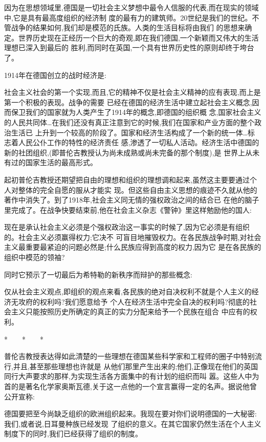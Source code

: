 ﻿\documentclass[12pt]{article}
\begin{document}
因为在思想领域里,德国是一切社会主义梦想中最令人信服的代表,而在现实的领域中,它是具有最高度组织的经济制
度的最有力的建筑师。20世纪是我们的世纪。不管战争的结果如何,我们却是模范的氏族。人类的生活目标将由我们
的思想来确定。世界历史现在正经历一个巨大的奇观,即在我们德国,一个新颖而又伟大的生活理想已深入到最后的
胜利,而同时在英国,一个具有世界历史性的原则却终于垮台了。

1914年在德国创立的战时经济是:

社会主义社会的第一个实现,而且,它的精神不仅是社会主义精神的应有表现,而上是第一个积极的表现。战争的需要
已经在德国的经济生活中建立起社会主义概念,因而保卫我们的国家就为人类产生了1914年的概念,即德国的组织概
念,国家社会主义的人民共同体\ldots 在我们还没有真正注意到它的时候,我们在国家和产业方面的整个政治生活已
上升到一个较高的阶段了。国家和经济生活构成了一个新的统一体\ldots 标志着人民公仆工作的特性的经济责任
感,渗透了一切私人活动。经济生活中德国的新的社团组织,(即普伦吉教授认为尚未成熟或尚未完备的那个制度),是
世界上从未有过的国家生活的最高形式。

起初普伦吉教授还期望把自由的理想和组织的理想调和起来,虽然这主要要通过个人对整体的完全自愿的服从才能实
现。但这些自由主义思想的痕迹不久就从他的著作中消失了。到了1918年,社会主义同无情的强权政治之间的结合已
在他的脑子里完成了。在战争快要结束前,他在社会主义杂志《警钟》里这样勉励他的国人:

现在是承认社会主义必须是个强权政治这一事实的时候了,因为它必须是有组织的。社会主义必须赢得权力;它决不
可盲目地摧毁权力。在各民族战争时期,对社会主义最重要最紧迫的问题必然是;什么民族应得到高度的权力,因为它
是在各民族的组织中模范的领袖?

同时它预示了一切最后为希特勒的新秩序而辩护的那些概念:

仅从社会主义观点,即组织的观点来看,各民族的绝对自决权利不就是个人主义的经济无攻府的权利吗?我们愿意给予
个人在经济生活中完全自决的权利吗?彻底的社会主义只能按照历史所确定的真正的实力分配来给予一个民族在组合
中应有的权利。

*　　*　　*

普伦吉教授表达得如此清楚的一些理想在德国某些科学家和工程师的圈子中特别流行,并且,甚至那些理想也许就是
从他们那里产生出来的;他们,正像现在他们的英国同行大声要求的那样,为实现生活各方面集中的有计划的组织而叫
嚣。这些人中为首的是著名化学家奥斯瓦德,关于这一点他的一个宣言赢得一定的名声。据说他曾公开宣称:

德国要把至今尚缺乏组织的欧洲组织起来。我现在要对你们说明德国的一大秘密:我们,或者说,日耳曼种族已经发现
了组织的意义。在其它国家仍然生活在个人主义制度下的同时,我们已经获得了组织的制度。
\end{document}
